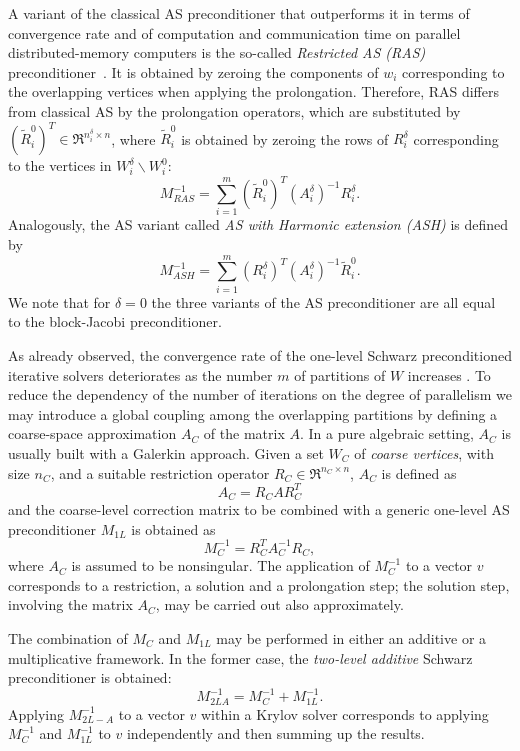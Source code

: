 A variant of the classical AS preconditioner that outperforms it
in terms of convergence rate and of computation and communication
time on parallel distributed-memory computers is the so-called \emph{Restricted AS
(RAS)} preconditioner~\cite{CAI_SARKIS,EFSTATHIOU}. It
is obtained by zeroing the components of $w_i$ corresponding to the
overlapping vertices when applying the prolongation. Therefore,
RAS differs from classical AS by the prolongation operators,
which are substituted by $(\tilde{R}_i^0)^T \in \Re^{n_i^\delta \times n}$,
where $\tilde{R}_i^0$ is obtained by zeroing the rows of $R_i^\delta$
corresponding to the vertices in $W_i^\delta \backslash W_i^0$:
\[
M_{RAS}^{-1}= \sum_{i=1}^m (\tilde{R}_i^0)^T 
(A_i^\delta)^{-1} R_i^{\delta}.
\]
Analogously, the AS variant called \emph{AS with Harmonic extension (ASH)}
is defined by
\[ M_{ASH}^{-1}= \sum_{i=1}^m (R_i^{\delta})^T 
(A_i^\delta)^{-1} \tilde{R}_i^0.
\]
We note that for $\delta=0$ the three variants of the AS preconditioner are
all equal to the block-Jacobi preconditioner.

As already observed, the convergence rate of the one-level Schwarz
preconditioned iterative solvers deteriorates as the number $m$ of partitions
of $W$ increases \cite{dd1_94,dd2_96}. To reduce the dependency
of the number of iterations on the degree of parallelism we may
introduce a global coupling among the overlapping partitions by defining 
a coarse-space approximation $A_C$ of the matrix $A$. 
In a pure algebraic setting, $A_C$ is usually built with
a Galerkin approach. Given a set $W_C$ of \emph{coarse vertices},
with size $n_C$, and a suitable restriction operator
$R_C \in \Re^{n_C \times n}$, $A_C$ is defined as
\[
A_C=R_C A R_C^T
\]
and the coarse-level correction matrix to be combined with a generic
one-level AS preconditioner $M_{1L}$ is obtained as
\[
M_{C}^{-1}= R_C^T A_C^{-1} R_C,
\]
where $A_C$ is assumed to be nonsingular. The application of $M_{C}^{-1}$
to a vector $v$ corresponds to a restriction, a solution and
a prolongation step; the solution step, involving the matrix $A_C$,
may be carried out also approximately.

The combination of $M_{C}$ and $M_{1L}$ may be
performed in either an additive or a multiplicative framework.
In the former case, the \emph{two-level additive} Schwarz preconditioner
is obtained:
\[
M_{2LA}^{-1} = M_{C}^{-1} + M_{1L}^{-1}. 
\]
Applying $M_{2L-A}^{-1}$ to a vector $v$ within a Krylov solver
corresponds to applying $M_{C}^{-1}$
and $M_{1L}^{-1}$ to $v$ independently and then summing up
the results.

